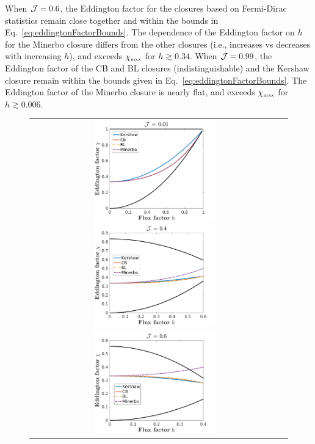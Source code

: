 When $\mathcal{J}=0.6$, the Eddington factor for the closures based on Fermi-Dirac statistics remain close together and within the bounds in Eq.~\eqref{eq:eddingtonFactorBounds}.  
The dependence of the Eddington factor on $h$ for the Minerbo closure differs from the other closures (i.e., increases vs decreases with increasing $h$), and exceeds $\chi_{\mbox{\tiny max}}$ for $h\gtrsim0.34$.  
When $\mathcal{J}=0.99$, the Eddington factor of the CB and BL closures (indistinguishable) and the Kershaw closure remain within the bounds given in Eq.~\eqref{eq:eddingtonFactorBounds}.  
The Eddington factor of the Minerbo closure is nearly flat, and exceeds $\chi_{\mbox{\tiny max}}$ for $h\gtrsim0.006$.  

\begin{figure}[H]
  \centering
  \begin{tabular}{cc}
    \includegraphics[width=0.5\textwidth]{figures/Closures0_01}
    \includegraphics[width=0.5\textwidth]{figures/Closures0_40} \\
    \includegraphics[width=0.5\textwidth]{figures/Closures0_60}

\end{tabular}
\end{figure}
